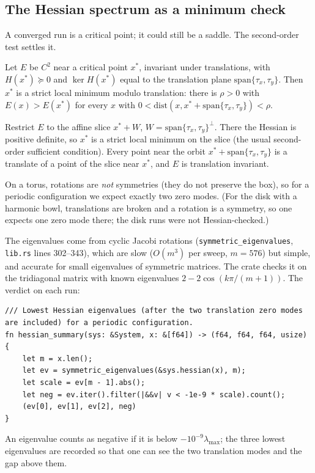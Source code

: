 \subsection{The Hessian spectrum as a minimum check}
A converged run is a critical point; it could still be a saddle. The second-order test settles it.
\begin{proposition}\label{prop:strictmin}
Let $E$ be $C^2$ near a critical point $x^*$, invariant under translations, with $H(x^*)\succeq0$ and $\ker H(x^*)$
equal to the translation plane $\mathrm{span}\{\tau_x,\tau_y\}$. Then $x^*$ is a strict local minimum modulo
translation: there is $\rho>0$ with $E(x)>E(x^*)$ for every $x$ with $0<\mathrm{dist}(x,x^*+\mathrm{span}\{\tau_x,\tau_y\})<\rho$.
\end{proposition}
\begin{humanproof}
Restrict $E$ to the affine slice $x^*+W$, $W=\mathrm{span}\{\tau_x,\tau_y\}^\perp$. There the Hessian is positive
definite, so $x^*$ is a strict local minimum on the slice (the usual second-order sufficient condition). Every point
near the orbit $x^*+\mathrm{span}\{\tau_x,\tau_y\}$ is a translate of a point of the slice near $x^*$, and $E$ is
translation invariant.
\end{humanproof}
On a torus, rotations are \emph{not} symmetries (they do not preserve the box), so for a periodic configuration we expect
exactly two zero modes. (For the disk with a harmonic bowl, translations are broken and a rotation is a symmetry, so
one expects one zero mode there; the disk runs were not Hessian-checked.)

The eigenvalues come from cyclic Jacobi rotations (\texttt{symmetric\_eigenvalues}, \texttt{lib.rs} lines 302--343),
which are slow ($O(m^3)$ per sweep, $m=576$) but simple, and accurate for small eigenvalues of symmetric matrices. The
crate checks it on the tridiagonal matrix with known eigenvalues $2-2\cos(k\pi/(m+1))$. The verdict on each run:
\begin{lstlisting}[language={},title={main.rs, lines 65--72}]
/// Lowest Hessian eigenvalues (after the two translation zero modes are included) for a periodic configuration.
fn hessian_summary(sys: &System, x: &[f64]) -> (f64, f64, f64, usize) {
    let m = x.len();
    let ev = symmetric_eigenvalues(&sys.hessian(x), m);
    let scale = ev[m - 1].abs();
    let neg = ev.iter().filter(|&&v| v < -1e-9 * scale).count();
    (ev[0], ev[1], ev[2], neg)
}
\end{lstlisting}
An eigenvalue counts as negative if it is below $-10^{-9}\lambda_{\max}$; the three lowest eigenvalues are recorded so
that one can see the two translation modes and the gap above them.

